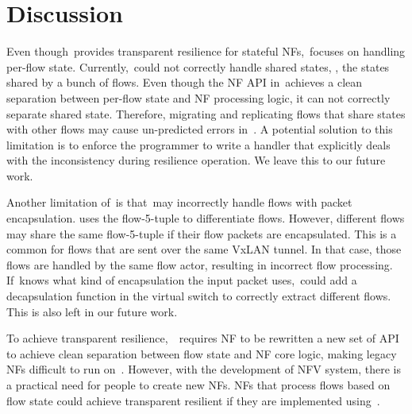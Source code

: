 \section{Discussion}
\label{sec:discussion}

Even though~\nfactor provides transparent resilience for stateful NFs,~\nfactor focuses on handling per-flow state. Currently,~\nfactor could not correctly handle shared states, \ie, the states shared by a bunch of flows. Even though the NF API in~\nfactor achieves a clean separation between per-flow state and NF processing logic, it can not correctly separate shared state. Therefore, migrating and replicating flows that share states with other flows may cause un-predicted errors in~\nfactor. A potential solution to this limitation is to enforce the programmer to write a handler that explicitly deals with the inconsistency during resilience operation. We leave this to our future work.

Another limitation of~\nfactor is that~\nfactor may incorrectly handle flows with packet encapsulation. \nfactor uses the flow-5-tuple to differentiate flows. However, different flows may share the same flow-5-tuple if their flow packets are encapsulated. This is a common for flows that are sent over the same VxLAN tunnel. In that case, those flows are handled by the same flow actor, resulting in incorrect flow processing. If~\nfactor knows what kind of encapsulation the input packet uses,~\nfactor could add a decapsulation function in the virtual switch to correctly extract different flows. This is also left in our future work.

To achieve transparent resilience,~\nfactor~requires NF to be rewritten a new set of API to achieve clean separation between flow state and NF core logic, making legacy NFs difficult to run on~\nfactor. However, with the development of NFV system, there is a practical need for people to create new NFs. NFs that process flows based on flow state could achieve transparent resilient if they are implemented using~\nfactor.

